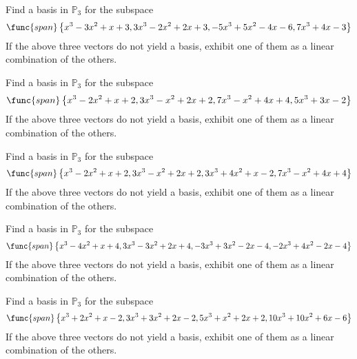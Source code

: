 \begin{enumialphparenastyle}
\begin{ex} Find a basis in $\mathbb{P}_{3}$ for the subspace 
\begin{equation*}
\func{span}\left\{
x^{3}-3x^{2}+x+3,3x^{3}-2x^{2}+2x+3,-5x^{3}+5x^{2}-4x-6,7x^{3}+4x-3\right\}
\end{equation*}
If the above three vectors do not yield a basis, exhibit one
of them as a linear combination of the others.
\end{ex}


\begin{ex} Find a basis in $\mathbb{P}_{3}$ for the subspace 
\begin{equation*}
\func{span}\left\{
x^{3}-2x^{2}+x+2,3x^{3}-x^{2}+2x+2,7x^{3}-x^{2}+4x+4,5x^{3}+3x-2\right\}
\end{equation*}
If the above three vectors do not yield a basis, exhibit one
of them as a linear combination of the others.
\end{ex}


\begin{ex} Find a basis in $\mathbb{P}_{3}$ for the subspace 
\begin{equation*}
\func{span}\left\{
x^{3}-2x^{2}+x+2,3x^{3}-x^{2}+2x+2,3x^{3}+4x^{2}+x-2,7x^{3}-x^{2}+4x+4\right
\}
\end{equation*}
If the above three vectors do not yield a basis, exhibit one
of them as a linear combination of the others.
\end{ex}


\begin{ex} Find a basis in $\mathbb{P}_{3}$ for the subspace 
\begin{equation*}
\func{span}\left\{
x^{3}-4x^{2}+x+4,3x^{3}-3x^{2}+2x+4,-3x^{3}+3x^{2}-2x-4,-2x^{3}+4x^{2}-2x-4
\right\}
\end{equation*}
If the above three vectors do not yield a basis, exhibit one
of them as a linear combination of the others.
\end{ex}


\begin{ex} Find a basis in $\mathbb{P}_{3}$ for the subspace 
\begin{equation*}
\func{span}\left\{
x^{3}+2x^{2}+x-2,3x^{3}+3x^{2}+2x-2,5x^{3}+x^{2}+2x+2,10x^{3}+10x^{2}+6x-6
\right\}
\end{equation*}
If the above three vectors do not yield a basis, exhibit one
of them as a linear combination of the others.
\end{ex}



\end{enumialphparenastyle}
